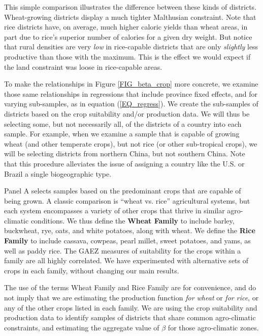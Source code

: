This simple comparison illustrates the difference between these kinds of districts. Wheat-growing districts display a much tighter Malthusian constraint. Note that rice districts have, on average, much higher caloric yields than wheat areas, in part due to rice's superior number of calories for a given dry weight. But notice that rural densities are very \textit{low} in rice-capable districts that are only \textit{slightly} less productive than those with the maximum. This is the effect we would expect if the land constraint was loose in rice-capable areas.

To make the relationships in Figure \ref{FIG_beta_crop} more concrete, we examine those same relationships in regressions that include province fixed effects, and for varying sub-samples, as in equation (\ref{EQ_regress}). We create the sub-samples of districts based on the crop suitability and/or production data. We will thus be selecting some, but not necessarily all, of the districts of a country into each sample. For example, when we examine a sample that is capable of growing wheat (and other temperate crops), but not rice (or other sub-tropical crops), we will be selecting districts from northern China, but not southern China. Note that this procedure alleviates the issue of assigning a country like the U.S. or Brazil a single biogeographic type.

Panel A selects samples based on the predominant crops that are capable of being grown. A classic comparison is ``wheat vs. rice'' agricultural systems, but each system encompasses a variety of other crops that thrive in similar agro-climatic conditions. We thus define the \textbf{Wheat Family} to include barley, buckwheat, rye, oats, and white potatoes, along with wheat. We define the \textbf{Rice Family} to include cassava, cowpeas, pearl millet, sweet potatoes, and yams, as well as paddy rice. The GAEZ measures of suitability for the crops within a family are all highly correlated. We have experimented with alternative sets of crops in each family, without changing our main results. 

The use of the terms Wheat Family and Rice Family are for convenience, and do not imply that we are estimating the production function \textit{for wheat} or \textit{for rice}, or any of the other crops listed in each family. We are using the crop suitability and production data to identify samples of districts that share common agro-climatic constraints, and estimating the aggregate value of $\beta$ for those agro-climatic zones.

